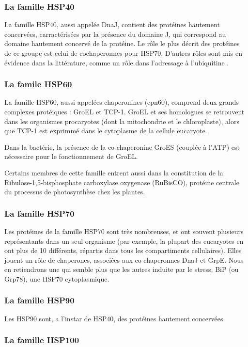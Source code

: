 \subsubsection{La famille HSP40} %
\label{ssub:la_famille_hsp40}

  La famille HSP40, aussi appelée DnaJ, contient des protéines hautement
  concervées, carractérisées par la présence du domaine J, qui correspond au
  domaine hautement concervé de la protéine. Le rôle le plus décrit des
  protéines de ce groupe est celui de cochaperonnes pour HSP70. D'autres rôles
  sont mis en évidence dans la littérature, comme un rôle dans l'adressage à
  l'ubiquitine \cite{lee1996}.

\subsubsection{La famile HSP60} %
\label{ssub:la_famile_hsp60}

  La famille HSP60, aussi appelées chaperonines (cpn60), comprend deux grands
  complexes protéiques : GroEL et TCP-1. GroEL et ses homologues se retrouvent
  dans les organismes procaryotes (dont la mitochondrie et le chloroplaste),
  alors que TCP-1 est exprimmé dans le cytoplasme de la cellule eucaryote.

  Dans la bactérie, la présence de la co-chaperonine GroES (couplée à l'ATP)
  est nécessaire pour le fonctionnement de GroEL.

  Certains membres de cette famille entrent aussi dans la constitution de la
  Ribulose-1,5-bisphosphate carboxylase oxygenase (RuBisCO), protéine centrale
  du processus de photosynthèse chez les plantes.

\subsubsection{La famille HSP70} %
\label{ssub:la_famille_hsp70}

  Les protéines de la famille HSP70 sont très nombreuses, et ont souvent
  plusieurs représentants dans un seul organisme (par exemple, la plupart des
  eucaryotes en ont plus de 10 différents, répartis dans tous les
  compartiments cellulaires). Elles jouent un rôle de chaperones, associées
  aux co-chaperonnes DnaJ et GrpE. Nous en retiendrons une qui semble plus que
  les autres induite par le stress, BiP (ou Grp78), une HSP70 cytoplasmique.

\subsubsection{La famille HSP90} %
\label{ssub:la_famille_hsp90}

  Les HSP90 sont, a l'instar de HSP40, des protéines hautement concervées.

\subsubsection{La famille HSP100} %
\label{ssub:la_famille_hsp100}



